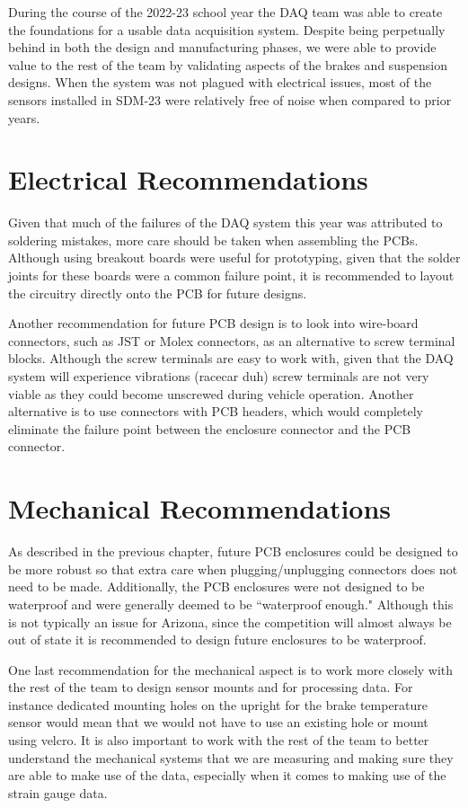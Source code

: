 During the course of the 2022-23 school year the DAQ team was able to create the foundations for a usable data acquisition system.
Despite being perpetually behind in both the design and manufacturing phases, we were able to provide value to the rest of the team by validating aspects of the brakes and suspension designs.
When the system was not plagued with electrical issues, most of the sensors installed in SDM-23 were relatively free of noise when compared to prior years.

\section{Electrical Recommendations}
Given that much of the failures of the DAQ system this year was attributed to soldering mistakes, more care should be taken when assembling the PCBs.
Although using breakout boards were useful for prototyping, given that the solder joints for these boards were a common failure point, it is recommended to layout the circuitry directly onto the PCB for future designs.
\vspace{1em}

Another recommendation for future PCB design is to look into wire-board connectors, such as JST or Molex connectors, as an alternative to screw terminal blocks.
Although the screw terminals are easy to work with, given that the DAQ system will experience vibrations (racecar duh) screw terminals are not very viable as they could become unscrewed during vehicle operation.
Another alternative is to use connectors with PCB headers, which would completely eliminate the failure point between the enclosure connector and the PCB connector.

\section{Mechanical Recommendations}
As described in the previous chapter, future PCB enclosures could be designed to be more robust so that extra care when plugging/unplugging connectors does not need to be made.
Additionally, the PCB enclosures were not designed to be waterproof and were generally deemed to be ``waterproof enough."
Although this is not typically an issue for Arizona, since the competition will almost always be out of state it is recommended to design future enclosures to be waterproof.
\vspace{1em}

One last recommendation for the mechanical aspect is to work more closely with the rest of the team to design sensor mounts and for processing data.
For instance dedicated mounting holes on the upright for the brake temperature sensor would mean that we would not have to use an existing hole or mount using velcro.
It is also important to work with the rest of the team to better understand the mechanical systems that we are measuring and making sure they are able to make use of the data, especially when it comes to making use of the strain gauge data.

